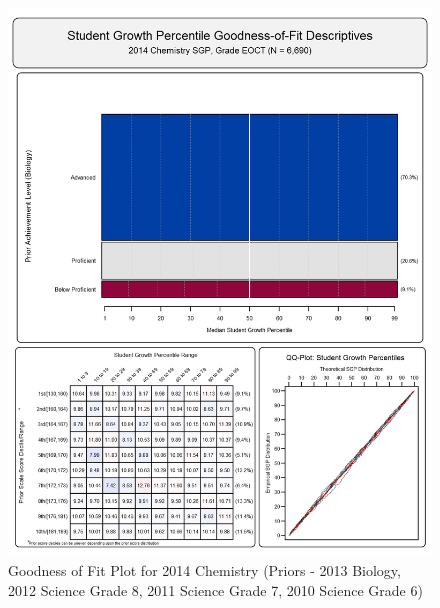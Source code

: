 \documentclass[12pt]{article}
\begin{document}
\begin{figure}[htbp]
\centering
\includegraphics{../img/Goodness_of_Fit/CHEMISTRY.2014/2014_CHEMISTRY_EOCT;2013_BIOLOGY_EOCT;2012_SCIENCE_8;2011_SCIENCE_7;2010_SCIENCE_6.png}
\caption{Goodness of Fit Plot for 2014 Chemistry (Priors - 2013 Biology,
2012 Science Grade 8, 2011 Science Grade 7, 2010 Science Grade 6)}
\end{figure}
\end{document}
